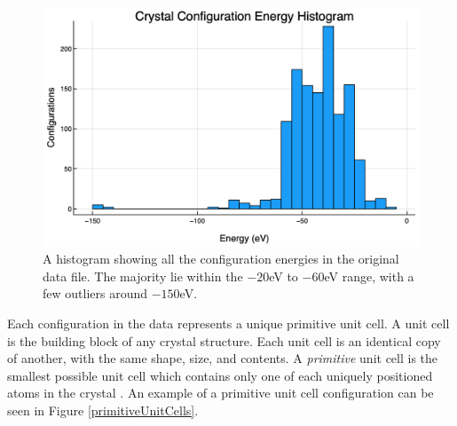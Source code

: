 \begin{figure}[h]
\includegraphics[scale = 0.3]{Figures/UnitCellEnergies}
\caption{A histogram showing all the configuration energies in the original data file. The majority lie within the $-20$eV to $-60$eV range, with a few outliers around $-150$eV.
\label{histEnergy}} 
\end{figure}

\par Each configuration in the data represents a unique primitive unit cell. A unit cell is the building block of any crystal structure. Each unit cell is an identical copy of another, with the same shape, size, and contents. A \textit{primitive} unit cell is the smallest possible unit cell which contains only one of each uniquely positioned atoms in the crystal \cite{solidStateBook}. An example of a primitive unit cell configuration can be seen in Figure \ref{primitiveUnitCells}.

